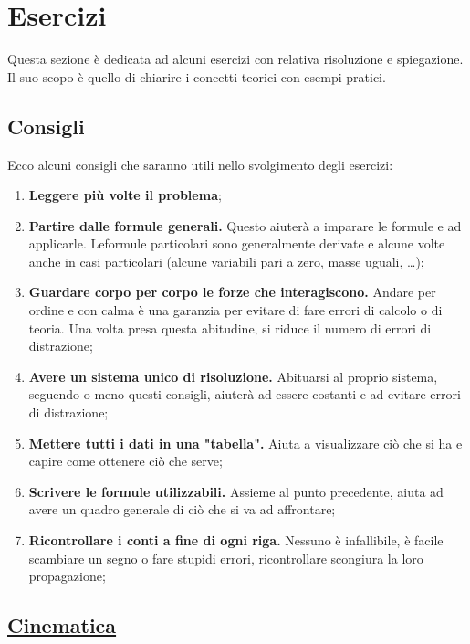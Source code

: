 
\section{Esercizi}
Questa sezione è dedicata ad alcuni esercizi con relativa risoluzione e spiegazione. Il suo scopo
è quello di chiarire i concetti teorici con esempi pratici.

\subsection*{Consigli}
Ecco alcuni consigli che saranno utili nello svolgimento degli esercizi:
\begin{enumerate}
	\item \textbf{Leggere più volte il problema};
	\item \textbf{Partire dalle formule generali.} Questo aiuterà a imparare le formule e ad 
	applicarle. Leformule particolari sono generalmente derivate e alcune volte anche in casi 
        particolari (alcune variabili pari a zero, masse uguali, \ldots);
	\item \textbf{Guardare corpo per corpo le forze che interagiscono.} Andare per ordine e con calma 
	è una garanzia per evitare di fare errori di calcolo o di teoria. Una volta presa
	questa abitudine, si riduce il numero di errori di distrazione;
	\item \textbf{Avere un sistema unico di risoluzione.} Abituarsi al proprio sistema, seguendo o 
	meno questi consigli, aiuterà ad essere costanti e ad evitare errori di distrazione;
	\item \textbf{Mettere tutti i dati in una "tabella".} Aiuta a visualizzare ciò che si ha e capire
	come ottenere ciò che serve;
	\item \textbf{Scrivere le formule utilizzabili.} Assieme al punto precedente, aiuta ad avere un
	quadro generale di ciò che si va ad affrontare;
	\item \textbf{Ricontrollare i conti a fine di ogni riga.} Nessuno è infallibile, è facile 
	scambiare un segno o fare stupidi errori, ricontrollare scongiura la loro propagazione;
\end{enumerate}

\subsection*{\hyperref[sec:cinematica]{Cinematica}}\label{ex:cinematica}

